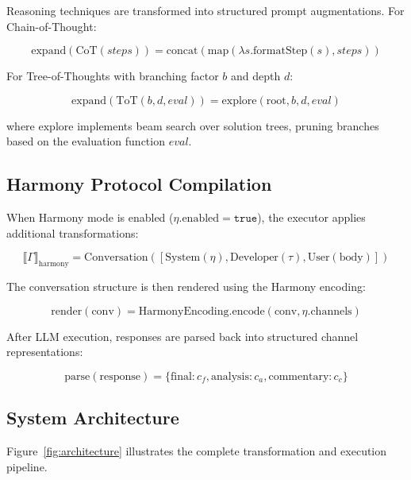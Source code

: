 \documentclass[11pt,a4paper]{article}
\begin{document}
Reasoning techniques are transformed into structured prompt augmentations. For Chain-of-Thought:

$$\text{expand}(\text{CoT}(steps)) = \text{concat}(\text{map}(\lambda s. \text{formatStep}(s), steps))$$

For Tree-of-Thoughts with branching factor $b$ and depth $d$:

$$\text{expand}(\text{ToT}(b, d, eval)) = \text{explore}(\text{root}, b, d, eval)$$

where $\text{explore}$ implements beam search over solution trees, pruning branches based on the evaluation function $eval$.

\subsection{Harmony Protocol Compilation}

When Harmony mode is enabled ($\eta.\text{enabled} = \texttt{true}$), the executor applies additional transformations:

$$\llbracket \Gamma \rrbracket_{\text{harmony}} = \text{Conversation}([\text{System}(\eta), \text{Developer}(\tau), \text{User}(\text{body})])$$

The conversation structure is then rendered using the Harmony encoding:

$$\text{render}(\text{conv}) = \text{HarmonyEncoding}.\text{encode}(\text{conv}, \eta.\text{channels})$$

After LLM execution, responses are parsed back into structured channel representations:

$$\text{parse}(\text{response}) = \{\text{final}: c_f, \text{analysis}: c_a, \text{commentary}: c_c\}$$

\subsection{System Architecture}

Figure~\ref{fig:architecture} illustrates the complete transformation and execution pipeline.
\end{document}
